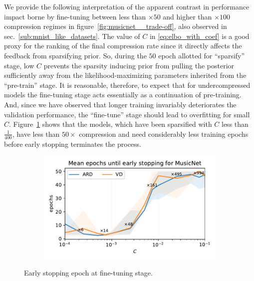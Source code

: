 \documentclass[a4paper,10pt,twocolumn]{article}
\begin{document}

We provide the following interpretation of the apparent contrast in performance impact
borne by fine-tuning between less than $\times50$ and higher than $\times100$ compression
regimes in figure~\ref{fig:musicnet__trade-off}, also observed in sec.~\ref{sub:mnist_like_datasets}.
%
The value of $C$ in \eqref{eq:elbo_with_coef} is a good proxy for the ranking of the
final compression rate since it directly affects the feedback from sparsifying prior.
So, during the $50$ epoch allotted for ``sparsify'' stage, low $C$ prevents the sparsity
inducing prior from pulling the posterior sufficiently away from the likelihood-maximizing
parameters inherited from the ``pre-train'' stage. It is reasonable, therefore, to expect
that for undercompressed models the fine-tuning stage acts essentially as a continuation
of pre-training. And, since we have observed that longer training invariably deteriorates
the validation performance, the ``fine-tune'' stage should lead to overfitting for small
$C$.
%
Figure~\ref{fig:musicnet__early_stopping} shows that the models, which have been sparsified
with $C$ less than $\tfrac1{400}$, have less than $50\times$ compression and need considerably
less training epochs before early stopping terminates the process.

\begin{figure}[!t]
  \centering
  \begin{subfigure}[b]{1.\columnwidth}  %
    \centering
    \includegraphics[width=\columnwidth]{figure__fine-tune_fx__early.pdf}
  \end{subfigure}
  \caption{%
    Early stopping epoch at fine-tuning stage.
  }
  \label{fig:musicnet__early_stopping}
\end{figure}
\end{document}
